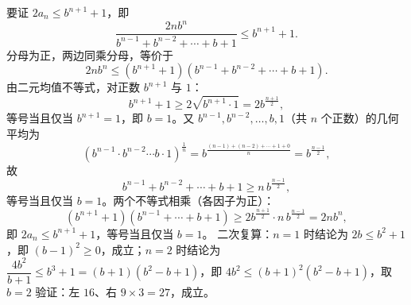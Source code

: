 \begin{answer}
要证 $2a_n\leqslant b^{n+1}+1$，即
\nopagebreak[4]
\[
\frac{2nb^n}{b^{n-1}+b^{n-2}+\cdots+b+1}\leqslant b^{n+1}+1.
\]
分母为正，两边同乘分母，等价于
\nopagebreak[4]
\[
2nb^n\leqslant\left(b^{n+1}+1\right)\left(b^{n-1}+b^{n-2}+\cdots+b+1\right).
\]
由二元均值不等式，对正数 $b^{n+1}$ 与 $1$：
\nopagebreak[4]
\[
b^{n+1}+1\geqslant2\sqrt{b^{n+1}\cdot1}=2b^{\frac{n+1}{2}},
\]
等号当且仅当 $b^{n+1}=1$，即 $b=1$。又 $b^{n-1},b^{n-2},\dots,b,1$（共 $n$ 个正数）的几何平均为
\nopagebreak[4]
\[
\left(b^{n-1}\cdot b^{n-2}\cdots b\cdot1\right)^{\frac1n}=b^{\frac{(n-1)+(n-2)+\cdots+1+0}{n}}=b^{\frac{n-1}{2}},
\]
故
\nopagebreak[4]
\[
b^{n-1}+b^{n-2}+\cdots+b+1\geqslant n\,b^{\frac{n-1}{2}},
\]
等号当且仅当 $b=1$。两个不等式相乘（各因子为正）：
\nopagebreak[4]
\[
\left(b^{n+1}+1\right)\left(b^{n-1}+\cdots+b+1\right)\geqslant2b^{\frac{n+1}{2}}\cdot n\,b^{\frac{n-1}{2}}=2nb^n,
\]
即 $2a_n\leqslant b^{n+1}+1$，等号当且仅当 $b=1$。
二次复算：$n=1$ 时结论为 $2b\leqslant b^2+1$，即 $(b-1)^2\geqslant0$，成立；$n=2$ 时结论为 $\dfrac{4b^2}{b+1}\leqslant b^3+1=(b+1)(b^2-b+1)$，即 $4b^2\leqslant(b+1)^2(b^2-b+1)$，取 $b=2$ 验证：左 $16$、右 $9\times3=27$，成立。



\end{answer}
